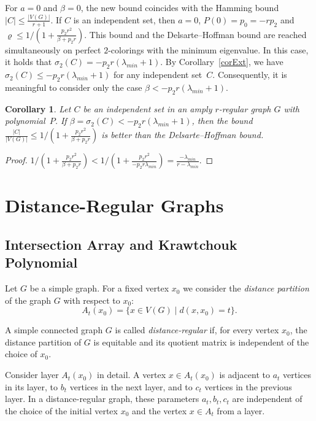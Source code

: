 \documentclass[11pt]{article}
\newtheorem{corollary}{Corollary}[section]
\theoremstyle{definition}
\begin{document}
 For $a=0$ and $\beta=0$, the new bound coincides
 with the
Hamming bound $|C|\leq \frac{|V(G)|}{r+1} $. If $C$ is an independent
set, then $a=0$, $P(0)=p_0=-rp_2$ and $\varrho\leq
1/(1+\frac{p_2r^2}{\beta+p_2r})$. This bound and the Delsarte--Hoffman bound
are reached simultaneously on perfect $2$-colorings with the minimum
eigenvalue.  In this case, it holds that $\sigma_2(C)=
-p_2r(\lambda_{min}+1)$. By Corollary~\ref{corExt},  we
have $\sigma_2(C)\leq -p_2r(\lambda_{min}+1)$ for any
independent set~$C$. Consequently, it is meaningful to consider only the
case   $\beta< -p_2r(\lambda_{min}+1)$.

\begin{corollary}\label{corExt2}
Let $C$ be an independent set  in an amply $r$-regular graph $G$ with
polynomial~$P$. If $\beta=\sigma_2(C)<
-p_2r(\lambda_{min}+1)$, then the bound $\frac{|C|}{|V(G)|}\leq
1/(1+\frac{p_2r^2}{\beta+p_2r})$ is  better than the Delsarte--Hoffman
bound.
\end{corollary}
\begin{proof}
$1/(1+\frac{p_2r^2}{\beta+p_2r})<1/(1+\frac{p_2r^2}{-p_2r\lambda_{min}})=\frac
{-\lambda_{min}}{r-\lambda_{min}}$. 
\end{proof}







\section{Distance-Regular Graphs}

\subsection{Intersection Array and Krawtchouk Polynomial}\label{4.1}


Let $G$ be a simple graph. For a
fixed vertex $x_0$ we consider the {\sl distance
partition} of the graph $G$ with respect to $x_0$: $$A_t(x_0)=\{x\in V(G) \mid
d(x,x_0)=t\}.$$

A simple connected graph $G$ is called {\sl distance-regular} if, for every vertex $x_0$, the distance partition of $G$  is equitable and  its quotient matrix is independent of the choice of $x_0$. 

 Consider layer $A_t(x_0)$ in detail.  A vertex $x\in A_t(x_0)$ is adjacent to
$a_t$ vertices in its layer, to $b_t$ vertices in the next layer, and to
$c_t$ vertices in the previous layer. In a distance-regular graph,
these  parameters $a_t, b_t, c_t$ are independent of the choice of the initial vertex $x_0$
and the vertex $x\in A_t$ from a layer.
\end{document}
